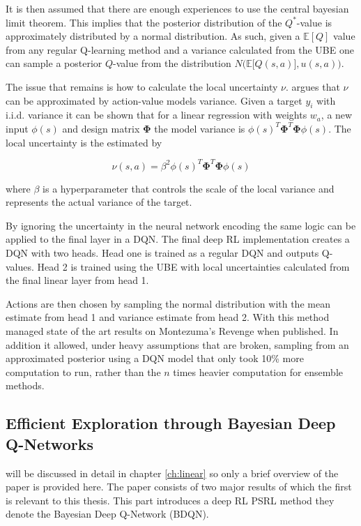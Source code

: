 It is then assumed that there are enough experiences to use the central bayesian limit theorem. This implies that the posterior distribution of the $Q^*$-value is approximately distributed by a normal distribution\citep[p.~224]{berger_1985}. As such, given a $\mathbb{E}[Q]$ value from any regular Q-learning method and a variance calculated from the UBE one can sample a posterior $Q$-value from the distribution $N\bigg(\mathbb{E}\big[Q(s,a)\big], u(s,a)\bigg)$.

The issue that remains is how to calculate the local uncertainty $\nu$. \cite{donoghue_2017} argues that $\nu$ can be approximated by action-value models variance. Given a target $y_i$ with i.i.d. variance it can be shown that for a linear regression with weights $w_a$, a new input $\phi(s)$ and design matrix $\bm{\Phi}$ the model variance is $\phi(s)^T\bm{\Phi}^T\bm{\Phi}\phi(s)$. The local uncertainty is the estimated by

\begin{equation}
    \nu(s,a) = \beta^2\phi(s)^T\bm{\Phi}^T\bm{\Phi}\phi(s)
\end{equation}

where $\beta$ is a hyperparameter that controls the scale of the local variance and represents the actual variance of the target.

By ignoring the uncertainty in the neural network encoding the same logic can be applied to the final layer in a DQN. The final deep RL implementation creates a DQN with two heads. Head one is trained as a regular DQN and outputs Q-values. Head 2 is trained using the UBE with local uncertainties calculated from the final linear layer from head 1.

Actions are then chosen by sampling the normal distribution with the mean estimate from head 1 and variance estimate from head 2. With this method \cite{donoghue_2017} managed state of the art results on Montezuma's Revenge when published. In addition it allowed, under heavy assumptions that are broken, sampling from an approximated posterior using a DQN model that only took 10\% more computation to run, rather than the $n$ times heavier computation for ensemble methods.

\subsection{Efficient Exploration through Bayesian Deep Q-Networks}

\cite{azziz_2018} will be discussed in detail in chapter \ref{ch:linear} so only a brief overview of the paper is provided here. The paper consists of two major results of which the first is relevant to this thesis. This part introduces a deep RL PSRL method they denote the Bayesian Deep Q-Network (BDQN). 

